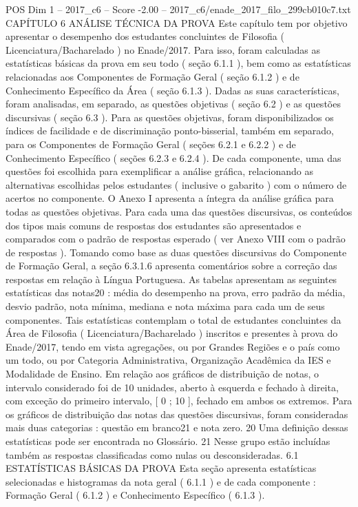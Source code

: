 \begin{textsample}{POS Dim 1 – 2017\_c6 – Score -2.00 – 2017\_c6/enade\_2017\_filo\_299cb010c7.txt}  \label{ex:f1_pos_291}
CAPÍTULO 6 ANÁLISE TÉCNICA DA PROVA Este capítulo tem por objetivo apresentar o desempenho dos estudantes concluintes de Filosofia ( Licenciatura/Bacharelado ) no Enade/2017.
Para isso, foram calculadas as estatísticas básicas da prova em seu todo ( seção 6.1.1 ), bem como as estatísticas relacionadas aos Componentes de Formação Geral ( seção 6.1.2 ) e de Conhecimento Específico da Área ( seção 6.1.3 ).
Dadas as suas características, foram analisadas, em separado, as questões objetivas ( seção 6.2 ) e as questões discursivas ( seção 6.3 ).
Para as questões objetivas, foram disponibilizados os índices de facilidade e de discriminação ponto-bisserial, também em separado, para os Componentes de Formação Geral ( seções 6.2.1 e 6.2.2 ) e de Conhecimento Específico ( seções 6.2.3 e 6.2.4 ).
De cada componente, uma das questões foi escolhida para exemplificar a análise gráfica, relacionando as alternativas escolhidas pelos estudantes ( inclusive o gabarito ) com o número de acertos no componente.
O Anexo I apresenta a íntegra da análise gráfica para todas as questões objetivas.
Para cada uma das questões discursivas, os conteúdos dos tipos mais comuns de respostas dos estudantes são apresentados e comparados com o padrão de respostas esperado ( ver Anexo VIII com o padrão de respostas ).
Tomando como base as duas questões discursivas do Componente de Formação Geral, a seção 6.3.1.6 apresenta comentários sobre a correção das respostas em relação à Língua Portuguesa.
As tabelas apresentam as seguintes estatísticas das notas20 : média do desempenho na prova, erro padrão da média, desvio padrão, nota mínima, mediana e nota máxima para cada um de seus componentes.
Tais estatísticas contemplam o total de estudantes concluintes da Área de Filosofia ( Licenciatura/Bacharelado ) inscritos e presentes à prova do Enade/2017, tendo em vista agregações, ou por Grandes Regiões e o país como um todo, ou por Categoria Administrativa, Organização Acadêmica da IES e Modalidade de Ensino.
Em relação aos gráficos de distribuição de notas, o intervalo considerado foi de 10 unidades, aberto à esquerda e fechado à direita, com exceção do primeiro intervalo, [ 0 ; 10 ], fechado em ambos os extremos.
Para os gráficos de distribuição das notas das questões discursivas, foram consideradas mais duas categorias : questão em branco21 e nota zero. 20 Uma definição dessas estatísticas pode ser encontrada no Glossário. 21 Nesse grupo estão incluídas também as respostas classificadas como nulas ou desconsideradas. 6.1 ESTATÍSTICAS BÁSICAS DA PROVA Esta seção apresenta estatísticas selecionadas e histogramas da nota geral ( 6.1.1 ) e de cada componente : Formação Geral ( 6.1.2 ) e Conhecimento Específico ( 6.1.3 ).

\end{textsample}
